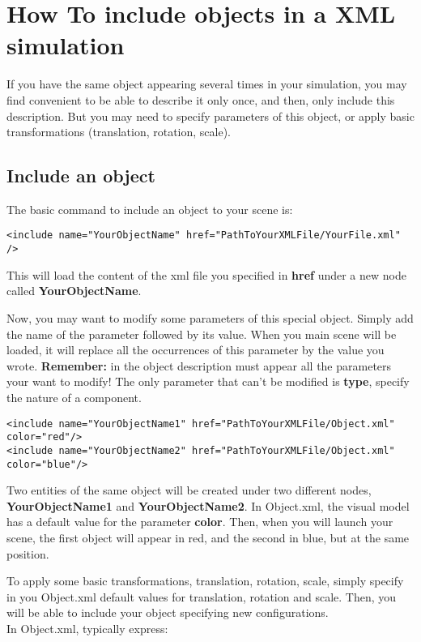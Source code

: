 
\section{How To include objects in a XML simulation}
If you have the same object appearing several times in your simulation, you may find convenient to be able to describe it only once, and then, only include this description. But you may need to specify parameters of this object, or apply basic transformations (translation, rotation, scale).


\subsection{Include an object}
\par
The basic command to include an object to your scene is:
\begin{verbatim}
<include name="YourObjectName" href="PathToYourXMLFile/YourFile.xml" />  
\end{verbatim}
This will load the content of the xml file you specified in { \bf href} under a new node called { \bf YourObjectName}.
\par
Now, you may want to modify some parameters of this special object. Simply add the name of the parameter followed by its value. When you main scene will be loaded, it will replace all the occurrences of this parameter by the value you wrote. {\bf Remember:} in the object description must appear all the parameters your want to modify! The only parameter that can't be modified is {\bf type}, specify the nature of a component.
\begin{verbatim}
<include name="YourObjectName1" href="PathToYourXMLFile/Object.xml" color="red"/>  
<include name="YourObjectName2" href="PathToYourXMLFile/Object.xml" color="blue"/>  
\end{verbatim}
Two entities of the same object will be created under two different nodes, {\bf YourObjectName1} and {\bf YourObjectName2}. In Object.xml, the visual model has a default value for the parameter {\bf color}. Then, when you will launch your scene, the first object will appear in red, and the second in blue, but at the same position.
\par
To apply some basic transformations, translation, rotation, scale, simply specify in you Object.xml default values for translation, rotation and scale. Then, you will be able to include your object specifying new configurations.\\
In Object.xml, typically express:
